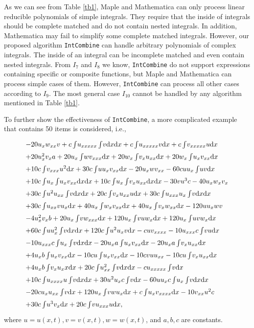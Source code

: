 As we can see from Table \ref{tb1}, Maple and Mathematica can only process linear reducible polynomials of simple integrals. They require that the inside of integrals should be complete matched and do not contain nested integrals. In addition, Mathematica may fail to simplify some complete matched integrals. However, our proposed algorithm \texttt{IntCombine} can handle arbitrary polynomials of complex integrals. The inside of an integral can be incomplete matched and even contain nested integrals. From $I_7$ and $I_8$ we know, \texttt{IntCombine} do not support expressions containing specific or composite functions, but Maple and Mathematica can process simple cases of them. However,  \texttt{IntCombine} can process all other cases according to $I_9$. The most general case $I_{10}$ cannot be handled by any algorithm mentioned in Table \ref{tb1}. 

To further show the effectiveness of \texttt{IntCombine}, a more complicated example that contains 50 items is considered, i.e.,
\begin{equation}
\def\arraystretch{1.5}
\begin{array}{l}
-20u_xw_{xx}v
+c\ii{u_{xxxxx}\ii{v}}
+c\ii{u_{xxxxx}v}
+c\ii{v_{xxxxx}u}\\%
+20u_x^2v_xa
+20u_x\ii{wv_{xxx}}
+20w_x\ii{v_xu_{xx}}
+20w_x\ii{u_xv_{xx}}\\%
+10c\ii{v_{xxx}u^2}
+30c\ii{uu_xv_{xx}}
-20u_xwv_{xx}
-60cuu_x\ii{uv}\\%
+10c\ii{u_x\ii{u_xv_{xx}}}
+10c\ii{u_x\ii{v_xu_{xx}}}
-30vu^3c
-40u_xw_xv_x\\%
+30c\ii{u^2u_{xx}\ii{v}}
+20c\ii{v_xu_{xx}u}
+30c\ii{u_{xxx}u_x\ii{v}}\\%
+30c\ii{u_{xx}vu_x}
+40u_x\ii{w_xv_{xx}}
+40u_x\ii{v_xw_{xx}}
-120uu_xwv\\%
-4u_x^2v_xb
+20u_x\ii{vw_{xxx}}
+120u_x\ii{vuw_x}
+120u_x\ii{uvw_x}\\%
+60c\ii{uu_x^2\ii{v}}
+120c\ii{u^2u_xv}
-cuv_{xxxx}
-10u_{xxx}c\ii{vu}\\%
-10u_{xxx}c\ii{u_x\ii{v}}
-20u_xa\ii{u_xv_{xx}}
-20u_xa\ii{v_xu_{xx}}\\%
+4u_xb\ii{u_xv_{xx}}
-10cu\ii{u_xv_{xx}}
-10c v u u_{xx}
-10cu\ii{v_xu_{xx}}\\%
+4u_xb\ii{v_xu_xx}
+20c\ii{u_{xx}^2\ii{v}}
-cu_{xxxxx}\ii{v}\\%
+10c\ii{u_{xxxx}u\ii{v}}
+30u^2u_xc\ii{v}
-60uu_xc\ii{u_x\ii{v}}\\%
-20cu_xu_{xx}\ii{v}
+120u_x\ii{vwu_x}
+c\ii{u_xv_{xxxx}}
-10v_{xx}u^2c\\%
+30c\ii{u^3v_x}
+20c\ii{vu_{xxx}u},\\%
\end{array}
\label{big50}
\end{equation}
where $u=u(x,t),v=v(x,t),w=w(x,t)$, and $a,b,c$ are constants. 

